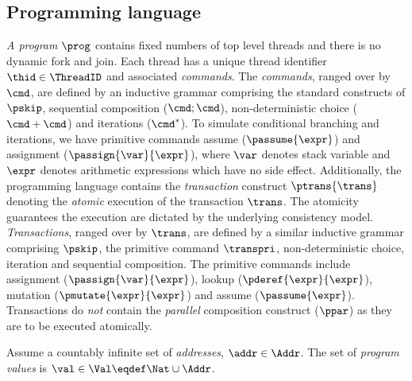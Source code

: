 \subsection{Programming language}


\emph{A program} \( \prog \) contains fixed numbers of top level threads and there is no dynamic fork and join.
Each thread has a unique thread identifier \( \thid \in \ThreadID \) and associated \emph{commands}.
The \emph{commands}, ranged over by $\cmd$, are defined by an inductive grammar comprising the standard constructs of $\pskip$, sequential composition ($\cmd; \cmd$), non-deterministic choice ($\cmd+\cmd$) and iterations ($\cmd^*$).
To simulate conditional branching and iterations, we have primitive commands assume (\( \passume{\expr}\)) and assignment (\( \passign{\var}{\expr} \)), where \( \var \) denotes stack variable and \( \expr \) denotes arithmetic expressions which have no side effect.
Additionally, the programming language contains the \emph{transaction} construct $\ptrans{\trans}$ denoting the \emph{atomic} execution of the transaction $\trans$. 
The atomicity guarantees the execution are dictated by the underlying consistency model.
\emph{Transactions}, ranged over by $\trans$, are defined by a similar inductive grammar comprising $\pskip$, the primitive command \( \transpri \), non-deterministic choice, iteration and sequential composition.
The primitive commands include assignment (\( \passign{\var}{\expr}\)), lookup (\( \pderef{\expr}{\expr}\)), mutation (\( \pmutate{\expr}{\expr}\)) and assume (\( \passume{\expr}\)). 
Transactions do \emph{not} contain the \emph{parallel} composition construct ($\ppar$) as they are to be executed atomically.

\begin{defn}
\label{def:program_values}
Assume a countably infinite set of \emph{addresses}, $\addr \in \Addr$. The set of \emph{program values} is $\val \in \Val \eqdef \Nat \cup \Addr$.
\end{defn}

